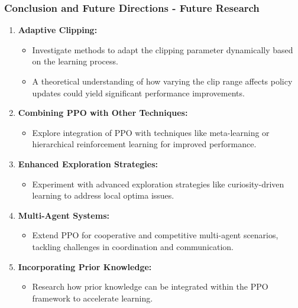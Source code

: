 \documentclass{beamer}
\begin{document}
\begin{frame}[fragile]
    \frametitle{Conclusion and Future Directions - Future Research}
    \begin{enumerate}
        \item \textbf{Adaptive Clipping:}
        \begin{itemize}
            \item Investigate methods to adapt the clipping parameter dynamically based on the learning process.
            \item A theoretical understanding of how varying the clip range affects policy updates could yield significant performance improvements.
        \end{itemize}

        \item \textbf{Combining PPO with Other Techniques:}
        \begin{itemize}
            \item Explore integration of PPO with techniques like meta-learning or hierarchical reinforcement learning for improved performance.
        \end{itemize}

        \item \textbf{Enhanced Exploration Strategies:}
        \begin{itemize}
            \item Experiment with advanced exploration strategies like curiosity-driven learning to address local optima issues.
        \end{itemize}

        \item \textbf{Multi-Agent Systems:}
        \begin{itemize}
            \item Extend PPO for cooperative and competitive multi-agent scenarios, tackling challenges in coordination and communication.
        \end{itemize}

        \item \textbf{Incorporating Prior Knowledge:}
        \begin{itemize}
            \item Research how prior knowledge can be integrated within the PPO framework to accelerate learning.
        \end{itemize}
    \end{enumerate}
\end{frame}
\end{document}
